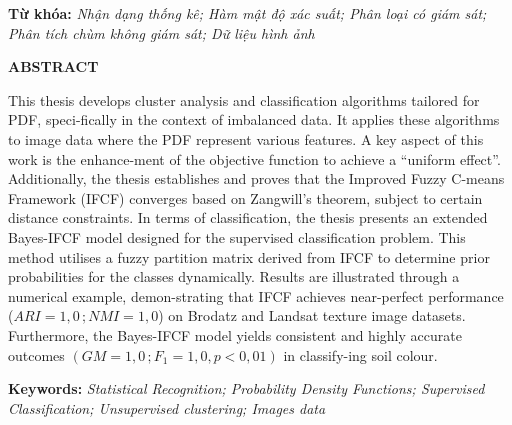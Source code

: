 \begin{flushleft}\fontsize{12}{16pt}\selectfont
	\textbf{Từ khóa:} \textit{Nhận dạng thống kê; Hàm mật độ xác suất; Phân loại có giám sát; Phân tích chùm không giám sát; Dữ liệu hình ảnh}
\end{flushleft}



\newpage
	\vspace*{50pt} %
\begin{center}
	{\fontsize{14}{0pt}\selectfont\bf ABSTRACT}
\end{center}
\vspace{20pt}
This thesis develops cluster analysis and classification algorithms tailored for PDF, speci-fically in the context of imbalanced data. It applies these algorithms to image data where the PDF represent various features. A key aspect of this work is the enhance-ment of the objective function to achieve a “uniform effect”. Additionally, the thesis establishes and proves that the Improved Fuzzy C-means Framework (IFCF) converges based on Zangwill’s theorem, subject to certain distance constraints.
In terms of classification, the thesis presents an extended Bayes-IFCF model designed for the supervised classification problem. This method utilises a fuzzy partition matrix derived from IFCF to determine prior probabilities for the classes dynamically.
Results are illustrated through a numerical example, demon-strating that IFCF achieves near-perfect performance ($ARI = 1{,}0\,; NMI = 1{,}0$) on Brodatz and Landsat texture image datasets. Furthermore, the Bayes-IFCF model yields consistent and highly accurate outcomes $( GM = 1{,}0\,; F_1 = 1{,}0, p<0{,}01)$  in classify-ing soil colour.
\begin{flushleft}\fontsize{12}{16pt}\selectfont
	\textbf{Keywords:} \textit{Statistical Recognition; Probability Density Functions; Supervised Classification; Unsupervised clustering; Images data}
\end{flushleft}

